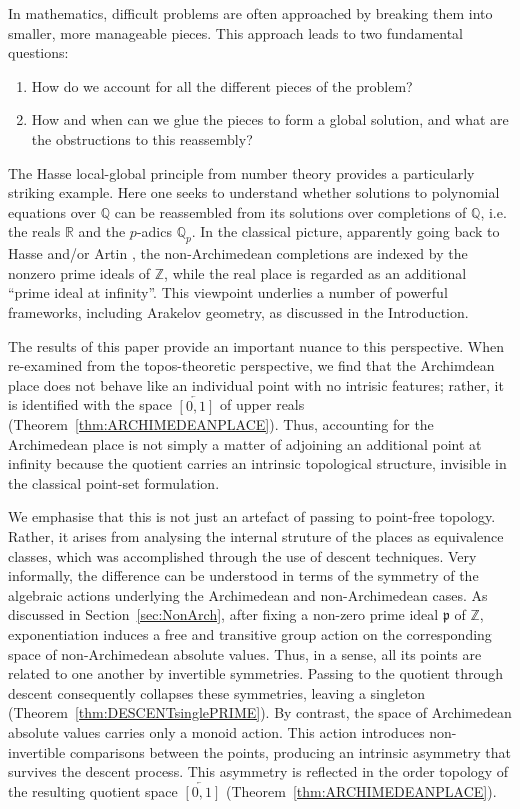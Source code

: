 \documentclass[a4paper, 11pt,reqno]{amsart}
\newcommand{\R}{\mathbb{R}}
\newcommand{\frap}{\mathfrak{p}}
\newcommand{\Z}{\mathbb{Z}}
\newcommand{\Q}{\mathbb{Q}}
\begin{document}
In mathematics, difficult problems are often approached by breaking them into smaller, more manageable pieces. This approach leads to two fundamental questions:

\begin{enumerate}%
	\item How do we account for all the different pieces of the problem?
	\item How and when can we glue the pieces to form a global solution, and what are the obstructions to this reassembly?
\end{enumerate}

The Hasse local-global principle from number theory provides a particularly striking example. Here one seeks to understand whether solutions to polynomial equations over $\Q$ can be reassembled from its solutions over completions of $\Q$, i.e. the reals $\R$ and the $p$-adics $\Q_p$. In the classical picture, apparently going back to Hasse and/or Artin \cite{WeilSister}, the non-Archimedean completions are indexed by the nonzero prime ideals of $\Z$, while the real place is regarded as an additional ``prime ideal at infinity''. This viewpoint underlies a number of powerful frameworks, including Arakelov geometry, as discussed in the Introduction.


The results of this paper provide an important nuance to this perspective. When re-examined from the topos-theoretic perspective, we find that the Archimdean place does not behave like an individual point with no intrisic features; rather, it is identified with the space $\overleftarrow{[0,1]}$ of upper reals (Theorem~\ref{thm:ARCHIMEDEANPLACE}). Thus, accounting for the Archimedean place is not simply a matter of adjoining an additional point at infinity because the quotient carries an intrinsic topological structure, invisible in the classical point-set formulation. 

\smallskip

We emphasise that this is not just an artefact of passing to point-free topology. Rather, it arises from analysing the internal struture of the places as equivalence classes, which was accomplished through the use of descent techniques. Very informally, the difference can be understood in terms of the symmetry of the algebraic actions underlying the Archimedean and non-Archimedean cases. As discussed in Section~\ref{sec:NonArch}, after fixing a non-zero prime ideal $\frap$ of $\Z$, exponentiation induces a free and transitive group action on the corresponding space of non-Archimedean absolute values. Thus, in a sense, all its points are related to one another by invertible symmetries. Passing to the quotient through descent consequently collapses these symmetries, leaving a singleton  (Theorem~\ref{thm:DESCENTsinglePRIME}). By contrast, the space of Archimedean absolute values carries only a monoid action. This action introduces non-invertible comparisons between the points, producing an intrinsic asymmetry that survives the descent process. This asymmetry is reflected in the order topology of the resulting quotient space $\overleftarrow{[0,1]}$ (Theorem~\ref{thm:ARCHIMEDEANPLACE}).
\smallskip 
\end{document}
